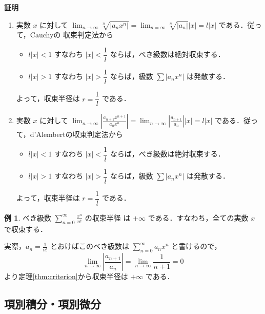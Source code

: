 \documentclass[10pt, uplatex, dvipdfmx]{jsarticle}
\makeatletter
\renewenvironment{proof}[1][\proofname]{\par
  \pushQED{\qed}%
  \normalfont \topsep6\p@\@plus6\p@\relax
  \trivlist
  \item\relax
  {\bfseries
  #1\@addpunct{.}}\hspace\labelsep\ignorespaces
}{%
  \popQED\endtrivlist\@endpefalse
}
\theoremstyle{definition}
\newtheorem{example}[theorem]{例}
\renewcommand{\proofname}{\textbf{証明}}
\numberwithin{equation}{section}
\newcommand{\ds}{\displaystyle}
\makeatother
\begin{document}
\begin{proof}
  \begin{enumerate}[(1)]
    \setlength{\itemsep}{1zh}
    
  \item 実数 $x$ に対して
    $\ds \lim_{n \to \infty} \sqrt[n]{|a_n x^n|} =
    \lim_{n=\infty}\sqrt[n]{|a_n|}|x| = l |x|$ である．従って，Cauchyの
    収束判定法から
    \begin{itemize}
      \setlength{\itemsep}{1zh}
    \item $l |x| <1$ すなわち $|x| < \dfrac{1}{l}$ ならば，べき級数は絶対収束する．
    \item $l |x| >1$ すなわち $|x| > \dfrac{1}{l}$ ならば，級数
      $\sum |a_n x^n|$ は発散する．
    \end{itemize}
    よって，収束半径は $r=\dfrac{1}{l}$ である．

  \item 実数 $x$ に対して
    $\ds \lim_{n \to \infty} \left| \frac{a_{n+1}x^{n+1}}{a_n
        x^n}\right| = \lim_{n \to \infty}
    \left|\frac{a_{n+1}}{a_n}\right| |x| = l |x|$ である．従って，d'Alembertの収束判定法から
    \begin{itemize}
      \setlength{\itemsep}{1zh}
    \item $l|x| <1$ すなわち $|x| < \dfrac{1}{l}$ ならば，べき級数は絶対収束する．
    \item $l|x| >1$ すなわち $|x| > \dfrac{1}{l}$ ならば，級数 $\sum |a_n x^n|$ は発散する．
    \end{itemize}
    よって，収束半径は $r= \dfrac{1}{l}$ である．
  \end{enumerate}
\end{proof}

\begin{example}
  べき級数 $\ds \sum_{n=0}^{\infty} \frac{x^n}{n!}$ の収束半径
  は $+\infty$ である．すなわち，全ての実数 $x$ で収束する．

  実際，$\ds a_n=\frac{1}{n!}$ とおけばこのべき級数は $\ds \sum_{n=0}^{\infty} a_n x^n$ と書けるので，
  \[
    \lim_{n \to \infty} \left| \frac{a_{n+1}}{a_n}\right| = \lim_{n \to \infty} \frac{1}{n+1} = 0
  \]
  より定理\ref{thm:criterion}から収束半径は $+\infty$ である．

\end{example}

\newpage

\subsection{項別積分・項別微分}
\end{document}

